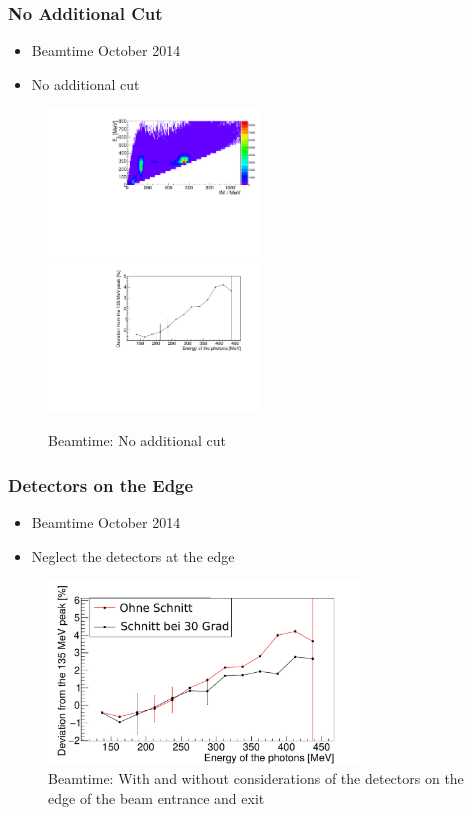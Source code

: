 \documentclass[slidestop,compress,mathserif]{beamer}
\begin{document}
\begin{frame}
	\frametitle{No Additional Cut }
	
	\begin{itemize}
		\item Beamtime October 2014
		\item No additional cut
\end{itemize}
	
		\begin{figure}
		
		\includegraphics[width=0.50\textwidth]{Pictures/20171904Uncharged2DHist}
		\hfill
		\includegraphics[width=0.50\textwidth]{Pictures/20170405StrahlzeitDeviatoinNoCut}
		\caption{Beamtime: No additional cut}
	\end{figure}	
\end{frame}

\begin{frame}
	\frametitle{Detectors on the Edge}
	
	\begin{itemize}
		\item Beamtime October 2014
		\item Neglect the detectors at the edge
	\end{itemize}

\begin{figure}
	\includegraphics[width=0.75\textwidth]{Pictures/20170405StrahlzeitBothDeviation}
	\caption{Beamtime: With and without considerations of the detectors on the edge of the beam entrance and exit }
\end{figure}	
\end{frame}
\end{document}
